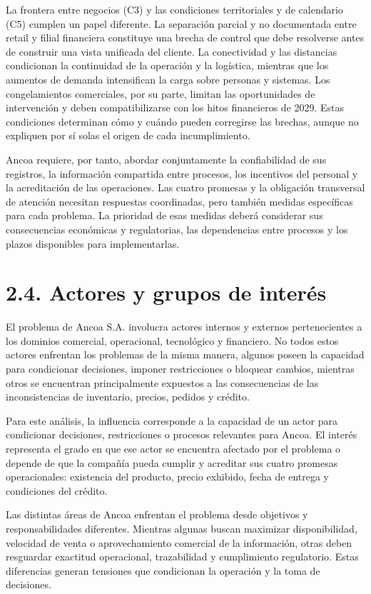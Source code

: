\documentclass[11pt]{article}
\begin{document}
La frontera entre negocios (C3) y las condiciones territoriales y de calendario (C5) cumplen un papel diferente. La separación parcial y no documentada entre retail y filial financiera constituye una brecha de control que debe resolverse antes de construir una vista unificada del cliente. La conectividad y las distancias condicionan la continuidad de la operación y la logística, mientras que los aumentos de demanda intensifican la carga sobre personas y sistemas. Los congelamientos comerciales, por su parte, limitan las oportunidades de intervención y deben compatibilizarse con los hitos financieros de 2029. Estas condiciones determinan cómo y cuándo pueden corregirse las brechas, aunque no expliquen por sí solas el origen de cada incumplimiento.

Ancoa requiere, por tanto, abordar conjuntamente la confiabilidad de sus registros, la información compartida entre procesos, los incentivos del personal y la acreditación de las operaciones. Las cuatro promesas y la obligación transversal de atención necesitan respuestas coordinadas, pero también medidas específicas para cada problema. La prioridad de esas medidas deberá considerar sus consecuencias económicas y regulatorias, las dependencias entre procesos y los plazos disponibles para implementarlas.

\section{2.4. Actores y grupos de interés}\label{actores-y-grupos-de-interes}

El problema de Ancoa S.A. involucra actores internos y externos pertenecientes a los dominios comercial, operacional, tecnológico y financiero. No todos estos actores enfrentan los problemas de la misma manera, algunos poseen la capacidad para condicionar decisiones, imponer restricciones o bloquear cambios, mientras otros se encuentran principalmente expuestos a las consecuencias de las inconsistencias de inventario, precios, pedidos y crédito.

Para este análisis, la influencia corresponde a la capacidad de un actor para condicionar decisiones, restricciones o procesos relevantes para Ancoa. El interés representa el grado en que ese actor se encuentra afectado por el problema o depende de que la compañía pueda cumplir y acreditar sus cuatro promesas operacionales: existencia del producto, precio exhibido, fecha de entrega y condiciones del crédito.

Las distintas áreas de Ancoa enfrentan el problema desde objetivos y responsabilidades diferentes. Mientras algunas buscan maximizar disponibilidad, velocidad de venta o aprovechamiento comercial de la información, otras deben resguardar exactitud operacional, trazabilidad y cumplimiento regulatorio. Estas diferencias generan tensiones que condicionan la operación y la toma de decisiones.
\end{document}
